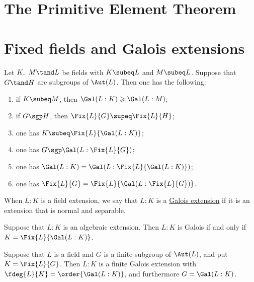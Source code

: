 \documentclass[a4paper]{article}
\begin{document}





\section{The Primitive Element Theorem}

\section{Fixed fields and Galois extensions}
\begin{tproposition}
  Let \( K,\ M \tand L \) be fields with \( K\subeq L \) and \( M\subeq L \).
  Suppose that \( G\tand H \) are subgroups of \( \Aut(L) \).
  Then one has the following: \begin{enumerate}[label=(\alph*)]
    \item if \( K\subeq M \), then \( \Gal(L:K) \geqslant \Gal(L:M) \);
    \item if \( G\sgp H \), then \( \Fix{L}{G} \supeq \Fix{L}{H} \);
    \item one has \( K\subeq \Fix{L}{\Gal(L:K)} \);
    \item one has \( G\sgp\Gal(L:\Fix{L}{G}) \);
    \item one has \( \Gal(L:K) = \Gal(L:\Fix{L}{\Gal(L:K)}) \);
    \item one has \( \Fix{L}{G} = \Fix{L}{\Gal(L:\Fix{L}{G})} \).
  \end{enumerate}
\end{tproposition}

\begin{tdefinition}
  When \( L:K \) is a field extension, we say that \( L:K \) is a \ul{Galois extension} if it is an extension that is normal and separable.
\end{tdefinition}

\begin{ttheorem}
  Suppose that \( L:K \) is an algebraic extension.
  Then \( L:K \) is Galois if and only if \( K=\Fix{L}{\Gal(L:K)} \).
\end{ttheorem}

\begin{ttheorem}
  Suppose that \( L \) is a field and \( G \) is a finite subgroup of \( \Aut(L) \), and put \( K=\Fix{L}{G} \).
  Then \( L:K \) is a finite Galois extension with \( \fdeg{L}{K}=\order{\Gal(L:K)} \), and furthermore \( G=\Gal(L:K) \).
\end{ttheorem}
\end{document}
